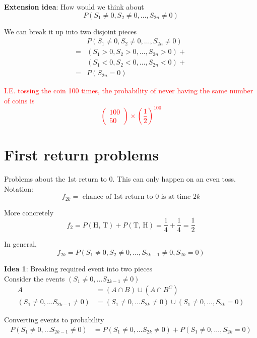 \textbf{Extension idea}: How would we think about 
\[
  P \left( S_1 \neq 0, S_2 \neq 0, \hdots, S_{2n} \neq 0 \right) 
\]

We can break it up into two disjoint pieces
\begin{align*}
  &P \left( S_1 \neq 0, S_2 \neq 0, \hdots, S_{2n} \neq 0 \right)  \\
 =& \left( S_1 > 0, S_2 > 0, \hdots, S_{2n} > 0 \right) + \\
  & \left( S_1 < 0, S_2 < 0, \hdots, S_{2n} < 0 \right) + \\
 =& P \left( S_{2n} = 0 \right) 
\end{align*}

\textcolor{red}{I.E. tossing the coin 100 times, the probability of never having the same number of coins is 
\[
  \begin{pmatrix} 100 \\ 50 \end{pmatrix} \times \left( \frac{1}{2} \right)^{100}
\]}

\section{First return problems}

Problems about the 1st return to $0$. This can only happen on an even toss. \\

Notation:
\[
  f_{2k} = \text{ chance of 1st return to $0$ is at time $2k$}
\]

More concretely
\[
  f_2 = P(\text{H, T}) + P( \text{T, H}) = \frac{1}{4} + \frac{1}{4} = \frac{1}{2}
\]

In general,
\[
  f_{2k} = P \left( S_1 \neq 0, S_2 \neq 0, \hdots, S_{2k - 1} \neq 0, S_{2k} = 0 \right) 
\]

\textbf{Idea 1}: Breaking required event into two pieces \\

Consider the events $(S_1 \neq 0, \hdots S_{2k -1} \neq 0)$ 
\begin{align*}
  A &= (A \cap B) \cup (A \cap B^C) \\
  (S_1 \neq 0, \hdots S_{2k -1} \neq 0) &= \left( S_1 \neq 0, \hdots S_{2k} \neq 0\right) \cup \left( S_1 \neq 0, \hdots, S_{2k} = 0 \right)
\end{align*}

Converting events to probability
\begin{align*}
  P(S_1 \neq 0, \hdots S_{2k -1} \neq 0) &= P\left( S_1 \neq 0, \hdots S_{2k} \neq 0\right) + P\left( S_1 \neq 0, \hdots, S_{2k} = 0 \right)
\end{align*}

